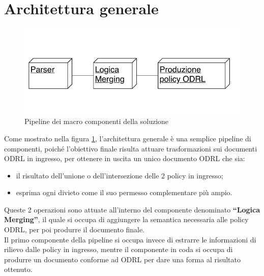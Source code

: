 \documentclass[12pt,a4paper,twoside]{book}
\begin{document}
\section{Architettura generale}
\begin{figure}[htp]
\centering
\includegraphics[scale=1]{../immagini/arch_gen.pdf}
\caption{Pipeline dei macro componenti della soluzione}
\label{archGenImpl}
\end{figure}
Come mostrato nella figura \ref{archGenImpl}, l'architettura generale è una semplice pipeline di componenti, poiché l'obiettivo finale risulta attuare trasformazioni sui documenti ODRL in ingresso, per ottenere in uscita un unico documento ODRL che sia:
\begin{itemize}
\item il risultato dell'unione o dell'intersezione delle 2 policy in ingresso;
\item esprima ogni divieto come il suo permesso complementare più ampio.
\end{itemize}
Queste 2 operazioni sono attuate all'interno del componente denominato \textbf{``Logica Merging''}, il quale si occupa di aggiungere la semantica necessaria alle policy ODRL, per poi produrre il documento finale.\\
Il primo componente della pipeline si occupa invece di estrarre le informazioni di rilievo dalle policy in ingresso, mentre il componente in coda si occupa di produrre un documento conforme ad ODRL per dare una forma al risultato ottenuto.
\end{document}
